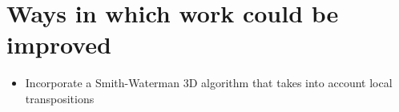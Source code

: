\section{Ways in which work could be improved}

\begin{itemize}
\item Incorporate a Smith-Waterman 3D algorithm that takes into account local transpositions
\end{itemize}